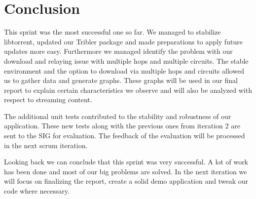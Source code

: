 	\section{Conclusion}
		This sprint was the most successful one so far. We managed to stabilize libtorrent, updated our Tribler package and made preparations to apply future updates more easy. Furthermore we managed identify the problem with our download and relaying issue with multiple hops and multiple circuits. The stable environment and the option to download via multiple hops and circuits allowed us to gather data and generate graphs. These graphs will be used in our final report to explain certain characteristics we observe and will also be analyzed with respect to streaming content.
		
		The additional unit tests contributed to the stability and robustness of our application. These new tests along with the previous ones from iteration 2 are sent to the SIG for evaluation. The feedback of the evaluation will be processed in the next scrum iteration.
		
		Looking back we can conclude that this sprint was very successful. A lot of work has been done and most of our big problems are solved. In the next iteration we will focus on finalizing the report, create a solid demo application and tweak our code where necessary.
